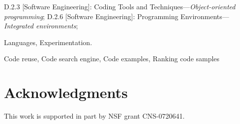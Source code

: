 \documentclass{sig-alternate}
\begin{document}


\vspace{1mm} 
D.2.3 {[Software Engineering]}: {Coding Tools and
Techniques---\emph{Object-oriented programming}}; D.2.6 {[Software Engineering]}: {Programming
Environments---\emph{Integrated environments}};

\vspace{1mm}  Languages,
Experimentation.

\vspace{1mm}  Code reuse, Code search
engine, Code examples, Ranking code samples

















\section*{Acknowledgments}

This work is supported in part by NSF grant CNS-0720641.

%



%
%
\end{document}
